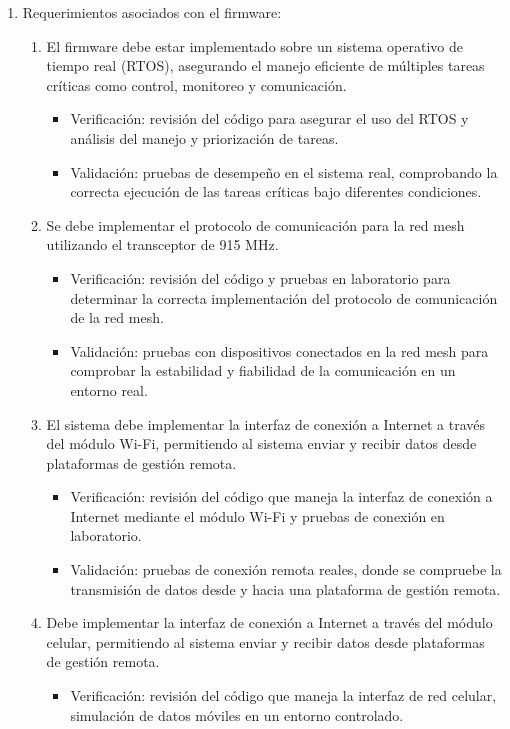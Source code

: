 \documentclass[
11pt, %
]{charter}
\begin{document}
\begin{enumerate}
	\item Requerimientos asociados con el firmware:
		\begin{enumerate}		
			\item El firmware debe estar implementado sobre un sistema operativo de tiempo real (RTOS), asegurando el manejo eficiente de múltiples tareas críticas como control, monitoreo y comunicación.
				\begin{itemize}
				\item Verificación: revisión del código para asegurar el uso del RTOS y análisis del manejo y priorización de tareas.
				\item Validación: pruebas de desempeño en el sistema real, comprobando la correcta ejecución de las tareas críticas bajo diferentes condiciones.
				\end{itemize}
			\item Se debe implementar el protocolo de comunicación para la red mesh utilizando el transceptor de 915 MHz.
				\begin{itemize}
				\item Verificación: revisión del código y pruebas en laboratorio para determinar la correcta implementación del protocolo de comunicación de la red mesh.
				\item Validación: pruebas con dispositivos conectados en la red mesh para comprobar la estabilidad y fiabilidad de la comunicación en un entorno real.
				\end{itemize}
			\item El sistema debe implementar la interfaz de conexión a Internet a través del módulo Wi-Fi, permitiendo al sistema enviar y recibir datos desde plataformas de gestión remota.
				\begin{itemize}
				\item Verificación: revisión del código que maneja la interfaz de conexión a Internet mediante el módulo Wi-Fi y pruebas de conexión en laboratorio.
				\item Validación: pruebas de conexión remota reales, donde se compruebe la transmisión de datos desde y hacia una plataforma de gestión remota.
				\end{itemize}
			\item Debe implementar la interfaz de conexión a Internet a través del módulo celular, permitiendo al sistema enviar y recibir datos desde plataformas de gestión remota.
				\begin{itemize}
				\item Verificación: revisión del código que maneja la interfaz de red celular, simulación de datos móviles en un entorno controlado.

\end{itemize}
\end{enumerate}
\end{enumerate}
\end{document}
